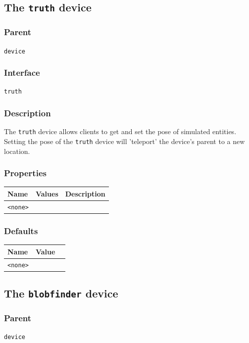 \documentclass[11pt,twoside]{report}
\begin{document}
\newpage
\subsection{The {\tt truth} device}

\subsubsection*{Parent}
{\tt device}

\subsubsection*{Interface}
{\tt truth}

\subsubsection*{Description}
The {\tt truth} device allows clients to get and set the pose of
simulated entities.  Setting the pose of the {\tt truth} device will
'teleport' the device's parent to a new location.

\subsubsection*{Properties}
\begin{tabularx}{\columnwidth}{llX}
\hline
Name & Values & Description \\
\hline
\verb'<none>'\\
\hline
\end{tabularx}

\subsubsection*{Defaults}
\begin{tabularx}{\columnwidth}{llX}
\hline
Name & Value\\
\hline
\verb'<none>'\\
\hline
\end{tabularx}

\newpage
\subsection{The {\tt blobfinder} device}

\subsubsection*{Parent}
{\tt device}
\end{document}
